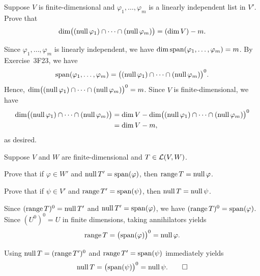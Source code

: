 \begin{exercise}
Suppose $V$ is finite-dimensional and $\varphi_1,\dots,\varphi_m$ is a linearly
independent list in $V'$. Prove that
\[ \operatorname{dim}\bigl((\operatorname{null}\varphi_1)\cap\cdots\cap(\operatorname{null}\varphi_m)\bigr)
   = (\operatorname{dim} V)-m. \]
\end{exercise}
\begin{solution}
Since $\varphi_1,\dots,\varphi_m$ is linearly independent, we have
$\operatorname{dim}\operatorname{span}(\varphi_1,\allowbreak\dots,\varphi_m)=m$. By Exercise~3F23, we have
\[ \operatorname{span}(\varphi_1,\dots,\varphi_m)
   = \bigl((\operatorname{null}\varphi_1)\cap\cdots\cap(\operatorname{null}\varphi_m)\bigr)^0. \]
Hence, $\operatorname{dim}\bigl((\operatorname{null}\varphi_1)\cap\cdots\cap(\operatorname{null}\varphi_m)\bigr)^0=m$.
Since $V$ is finite-dimensional, we have
\begin{align*}
\operatorname{dim}\bigl((\operatorname{null}\varphi_1)\cap\cdots\cap(\operatorname{null}\varphi_m)\bigr)
 &= \operatorname{dim} V-\operatorname{dim}\bigl((\operatorname{null}\varphi_1)\cap\cdots\cap(\operatorname{null}\varphi_m)\bigr)^0\\
 &= \operatorname{dim} V-m,
\end{align*}
as desired.
\end{solution}

\begin{exercise}
Suppose $V$ and $W$ are finite-dimensional and $T\in\mathcal{L}(V,W)$.
\begin{parts}
\item Prove that if $\varphi\in W'$ and $\operatorname{null} T'=\operatorname{span}(\varphi)$, then
  $\operatorname{range} T=\operatorname{null}\varphi$.
\item Prove that if $\psi\in V'$ and $\operatorname{range} T'=\operatorname{span}(\psi)$, then
  $\operatorname{null} T=\operatorname{null}\psi$.
\end{parts}
\end{exercise}
\begin{solution}\leavevmode
\begin{parts}
\item Since $(\operatorname{range} T)^0=\operatorname{null} T'$ and $\operatorname{null} T'=\operatorname{span}(\varphi)$, we have
  $(\operatorname{range} T)^0=\operatorname{span}(\varphi)$. Since $(U^0)^0=U$ in finite dimensions, taking
  annihilators yields
  \[ \operatorname{range} T = \bigl(\operatorname{span}(\varphi)\bigr)^0 = \operatorname{null}\varphi. \]
\item Using $\operatorname{null} T=(\operatorname{range} T')^0$ and $\operatorname{range} T'=\operatorname{span}(\psi)$ immediately
  yields
  \[ \operatorname{null} T = \bigl(\operatorname{span}(\psi)\bigr)^0 = \operatorname{null}\psi. \qedhere \]
\end{parts}
\end{solution}


